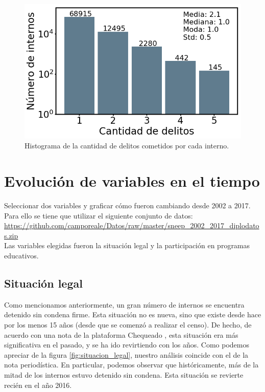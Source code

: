\documentclass[10pt]{article}
\begin{document}
\begin{figure}[H]
	\centering
	\includegraphics[scale=0.4]{graficos/cantidad_delitos.png}
	\caption{Histograma de la cantidad de delitos cometidos por cada interno. \label{fig:cantidad_delitos}}
\end{figure}

\section{Evolución de variables en el tiempo}

Seleccionar dos variables y graficar cómo fueron cambiando desde 2002 a 2017. Para ello se tiene que utilizar el siguiente conjunto de datos: \url{https://github.com/camporeale/Datos/raw/master/sneep_2002_2017_diplodatos.zip}\\

Las variables elegidas fueron la situación legal y la participación en programas educativos.

\subsection{Situación legal}

Como mencionamos anteriormente, un gran n\'umero de internos se encuentra detenido sin condena firme. Esta situaci\'on no es nueva, sino que existe desde hace por los menos 15 a\~nos (desde que se comenz\'o a realizar el censo). De hecho, de acuerdo con una nota de la plataforma Chequeado \cite{chequeadoCondenados}, esta situaci\'on era m\'as significativa en el pasado, y se ha ido revirtiendo con los a\~nos. Como podemos apreciar de la figura \ref{fig:situacion_legal}, nuestro an\'alisis coincide con el de la nota period\'istica. En particular, podemos observar que hist\'oricamente, m\'as de la mitad de los internos estuvo detenido sin condena. Esta situaci\'on se revierte reci\'en en el a\~no 2016.
\end{document}
